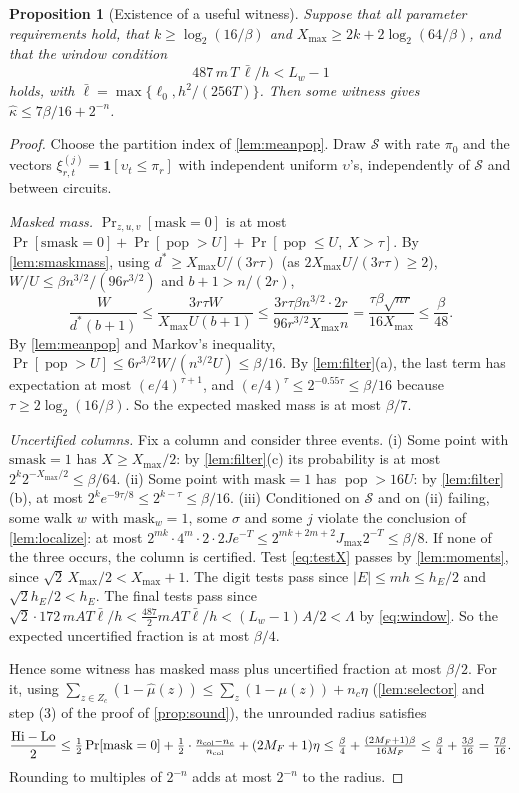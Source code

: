 \documentclass[11pt,letterpaper]{article}
\newtheorem{proposition}[theorem]{Proposition}
\theoremstyle{definition}
\theoremstyle{remark}
\newcommand{\pop}{\operatorname{pop}}
\newcommand{\smask}{\mathrm{smask}}
\newcommand{\mask}{\mathrm{mask}}
\newcommand{\ind}{\mathbf 1}
\newcommand{\cS}{\mathcal S}
\newcommand{\lgx}{\log_2}
\newcommand{\Xmax}{X_{\max}}
\newcommand{\khat}{\widehat\kappa}
\begin{document}
\begin{proposition}[Existence of a useful witness]\label{prop:complete}
Suppose that all parameter requirements hold, that
\(k\ge\lgx(16/\beta)\) and \(\Xmax\ge2k+2\lgx(64/\beta)\), and that the
window condition
\begin{equation}\label{eq:window}
 487\,m\,T\,\bar\ell/h<L_w-1
\end{equation}
holds, with \(\bar\ell=\max\{\ell_0,h^2/(256T)\}\). Then some witness
gives \(\khat\le7\beta/16+2^{-n}\).
\end{proposition}
\begin{proof}
Choose the partition index of \cref{lem:meanpop}. Draw \(\cS\) with
rate \(\pi_0\) and the vectors \(\xi^{(j)}_{r,t}=\ind[\upsilon_t\le\pi_r]\)
with independent uniform \(\upsilon\)'s, independently of \(\cS\) and
between circuits.

\emph{Masked mass.} \(\Pr_{z,u,v}[\mask=0]\) is at most
\(\Pr[\smask=0]+\Pr[\pop>U]+\Pr[\pop\le U,\ X>\tau]\). By
\cref{lem:smaskmass}, using \(d^*\ge\Xmax U/(3r\tau)\) (as
\(2\Xmax U/(3r\tau)\ge2\)), \(W/U\le\beta n^{3/2}/(96r^{3/2})\) and
\(b+1>n/(2r)\),
\[
 \frac{W}{d^*(b+1)}\le\frac{3r\tau W}{\Xmax U(b+1)}\le\frac{3r\tau\beta n^{3/2}\cdot2r}{96r^{3/2}\Xmax n}
 =\frac{\tau\beta\sqrt{nr}}{16\Xmax}\le\frac\beta{48}.
\]
By \cref{lem:meanpop} and Markov's inequality,
\(\Pr[\pop>U]\le6r^{3/2}W/(n^{3/2}U)\le\beta/16\). By
\cref{lem:filter}(a), the last term has expectation at most
\((e/4)^{\tau+1}\), and \((e/4)^{\tau}\le2^{-0.55\tau}\le\beta/16\)
because \(\tau\ge2\lgx(16/\beta)\). So the expected masked mass is at
most \(\beta/7\).

\emph{Uncertified columns.} Fix a column and consider three events.
(i) Some point with \(\smask=1\) has \(X\ge\Xmax/2\): by
\cref{lem:filter}(c) its probability is at most
\(2^k2^{-\Xmax/2}\le\beta/64\).
(ii) Some point with \(\mask=1\) has \(\pop>16U\): by
\cref{lem:filter}(b), at most \(2^ke^{-9\tau/8}\le2^{k-\tau}\le\beta/16\).
(iii) Conditioned on \(\cS\) and on (ii) failing, some walk \(w\) with
\(\mask_w=1\), some \(\sigma\) and some \(j\) violate the conclusion of
\cref{lem:localize}: at most
\(2^{mk}\cdot4^m\cdot2\cdot2Je^{-T}\le2^{mk+2m+2}J_{\max}2^{-T}\le\beta/8\).
If none of the three occurs, the column is certified. Test
\eqref{eq:testX} passes by \cref{lem:moments}, since
\(\sqrt2\,\Xmax/2<\Xmax+1\). The digit tests pass since
\(|E|\le mh\le h_E/2\) and \(\sqrt2h_E/2<h_E\). The final tests pass since
\(\sqrt2\cdot172\,mAT\bar\ell/h<\tfrac{487}{2}mAT\bar\ell/h<(L_w-1)A/2<\Lambda\)
by \eqref{eq:window}. So the expected uncertified fraction is at most
\(\beta/4\).

Hence some witness has masked mass plus uncertified fraction at most
\(\beta/2\). For it, using
\(\sum_{z\in Z_c}(1-\widehat\mu(z))\le\sum_z(1-\mu(z))+n_c\eta\)
(\cref{lem:selector} and step (3) of the proof of \cref{prop:sound}),
the unrounded radius satisfies
\[
 \frac{\mathrm{Hi}-\mathrm{Lo}}2\le\tfrac12\Pr[\mask=0]+\tfrac12\cdot\tfrac{n_{\rm col}-n_c}{n_{\rm col}}
 +(2M_F+1)\eta
 \le\tfrac\beta4+\tfrac{(2M_F+1)\beta}{16M_F}\le\tfrac\beta4+\tfrac{3\beta}{16}=\tfrac{7\beta}{16}.
\]
Rounding to multiples of \(2^{-n}\) adds at most \(2^{-n}\) to the
radius.
\end{proof}
\end{document}
